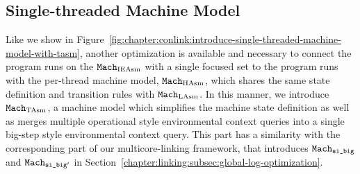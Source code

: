 \subsection{Single-threaded Machine Model}
\label{chapter:linking:subsec:single-threaded-machine-model}

Like we show in Figure~\ref{fig:chapter:conlink:introduce-single-threaded-machine-model-with-tasm}, 
another optimization is available and necessary 
to connect the program runs on the ${\mathrm{\texttt{Mach}}}_{\mathrm{IEAsm}}$ with  a single focused set to
the program runs with the per-thread machine model, ${\mathrm{\texttt{Mach}}}_{\mathrm{HAsm}}$, which shares the 
same state definition and transition rules with ${\mathrm{\texttt{Mach}}}_{\mathrm{LAsm}}$. 
In this manner,
we introduce ${\mathrm{\texttt{Mach}}}_{\mathrm{TAsm}}$, a machine model
which simplifies the machine state definition as  well as
merges multiple operational style environmental context queries into a single big-step style 
environmental context query.  
This part has a similarity with the corresponding part of our multicore-linking framework, 
that introduces ${{{\mathrm{\texttt{Mach}}}}_{{\mathrm{\texttt{si\_big}}}}}$ and ${{{\mathrm{\texttt{Mach}}}}_{{\mathrm{\texttt{si\_big}}}'}}$ in Section~\ref{chapter:linking:subsec:global-log-optimization}.



%
%
%


